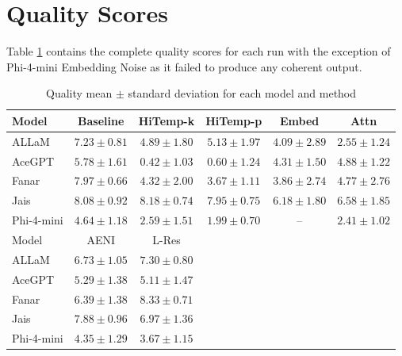 \documentclass[11pt]{article}
\begin{document}
\section{Quality Scores}

Table \ref{table:quality} contains the complete quality scores for each run with the exception of Phi-4-mini Embedding Noise as it failed to produce any coherent output.

\begin{table}[h]
\centering
\begin{tabular}{lccccc}
\toprule
Model & Baseline & HiTemp-k & HiTemp-p & Embed & Attn \\
\midrule
ALLaM  
& $7.23 \pm 0.81$ 
& $4.89 \pm 1.80$ 
& $5.13 \pm 1.97$ 
& $4.09 \pm 2.89$ 
& $2.55 \pm 1.24$ \\

AceGPT 
& $5.78 \pm 1.61$ 
& $0.42 \pm 1.03$
& $0.60 \pm 1.24$
& $4.31 \pm 1.50$ 
& $4.88 \pm 1.22$ \\

Fanar  
& $7.97 \pm 0.66$ 
& $4.32 \pm 2.00$ 
& $3.67 \pm 1.11$ 
& $3.86 \pm 2.74$ 
& $4.77 \pm 2.76$ \\

Jais   
& $8.08 \pm 0.92$ 
& $8.18 \pm 0.74$ 
& $7.95 \pm 0.75$ 
& $6.18 \pm 1.80$ 
& $6.58 \pm 1.85$ \\

Phi-4-mini
& $4.64 \pm 1.18$ 
& $2.59 \pm 1.51$
& $1.99 \pm 0.70$
& -- 
& $2.41 \pm 1.02$ \\
\midrule
Model & AENI & L-Res \\
\midrule
ALLaM  
& $6.73 \pm 1.05$ 
& $7.30 \pm 0.80$ \\

AceGPT 
& $5.29 \pm 1.38$ 
& $5.11 \pm 1.47$ \\

Fanar  
& $6.39 \pm 1.38$ 
& $8.33 \pm 0.71$ \\

Jais   
& $7.88 \pm 0.96$ 
& $6.97 \pm 1.36$ \\

Phi-4-mini
& $4.35 \pm 1.29$ 
& $3.67 \pm 1.15$ \\
\bottomrule
\end{tabular}
\caption{Quality mean $\pm$ standard deviation for each model and method}
\label{table:quality}
\end{table}

%
\end{document}
